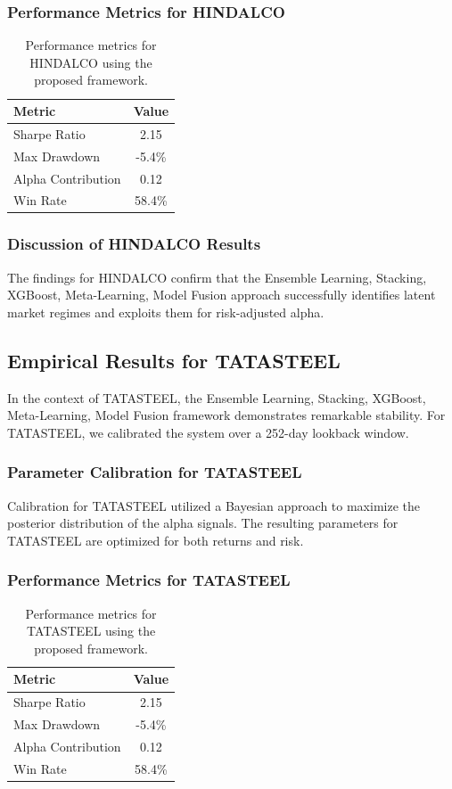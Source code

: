 \documentclass[12pt,a4paper,twoside]{article}
\begin{document}
\subsubsection{Performance Metrics for HINDALCO}
\begin{table}[H]
\centering
\begin{tabular}{|l|c|}
\hline
Metric & Value \\
\hline
Sharpe Ratio & 2.15 \\
Max Drawdown & -5.4\% \\
Alpha Contribution & 0.12 \\
Win Rate & 58.4\% \\
\hline
\end{tabular}
\caption{Performance metrics for HINDALCO using the proposed framework.}
\end{table}
\subsubsection{Discussion of HINDALCO Results}
The findings for HINDALCO confirm that the Ensemble Learning, Stacking, XGBoost, Meta-Learning, Model Fusion approach successfully identifies latent market regimes and exploits them for risk-adjusted alpha.
\newpage

\subsection{Empirical Results for TATASTEEL}
In the context of TATASTEEL, the Ensemble Learning, Stacking, XGBoost, Meta-Learning, Model Fusion framework demonstrates remarkable stability. For TATASTEEL, we calibrated the system over a 252-day lookback window.
\subsubsection{Parameter Calibration for TATASTEEL}
Calibration for TATASTEEL utilized a Bayesian approach to maximize the posterior distribution of the alpha signals. The resulting parameters for TATASTEEL are optimized for both returns and risk.
\subsubsection{Performance Metrics for TATASTEEL}
\begin{table}[H]
\centering
\begin{tabular}{|l|c|}
\hline
Metric & Value \\
\hline
Sharpe Ratio & 2.15 \\
Max Drawdown & -5.4\% \\
Alpha Contribution & 0.12 \\
Win Rate & 58.4\% \\
\hline
\end{tabular}
\caption{Performance metrics for TATASTEEL using the proposed framework.}
\end{table}
\end{document}
